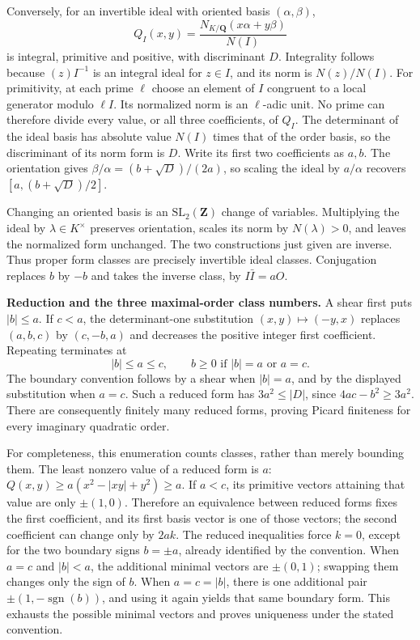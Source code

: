 \documentclass[11pt,a4paper]{article}
\begin{document}
Conversely, for an invertible ideal with oriented basis
\((\alpha,\beta)\), \[
Q_I(x,y)=\frac{N_{K/\mathbf Q}(x\alpha+y\beta)}{N(I)}
\] is integral, primitive and positive, with discriminant \(D\).
Integrality follows because \((z)I^{-1}\) is an integral ideal for
\(z\in I\), and its norm is \(N(z)/N(I)\). For primitivity, at each
prime \(\ell\) choose an element of \(I\) congruent to a local generator
modulo \(\ell I\). Its normalized norm is an \(\ell\)-adic unit. No
prime can therefore divide every value, or all three coefficients, of
\(Q_I\). The determinant of the ideal basis has absolute value \(N(I)\)
times that of the order basis, so the discriminant of its norm form is
\(D\). Write its first two coefficients as \(a,b\). The orientation
gives \(\beta/\alpha=(b+\sqrt D)/(2a)\), so scaling the ideal by
\(a/\alpha\) recovers \([a,(b+\sqrt D)/2]\).

Changing an oriented basis is an \(\mathrm{SL}_2(\mathbf Z)\) change of
variables. Multiplying the ideal by \(\lambda\in K^\times\) preserves
orientation, scales its norm by \(N(\lambda)>0\), and leaves the
normalized form unchanged. The two constructions just given are inverse.
Thus proper form classes are precisely invertible ideal classes.
Conjugation replaces \(b\) by \(-b\) and takes the inverse class, by
\(I\bar I=aO\).

\textbf{Reduction and the three maximal-order class numbers.} A shear
first puts \(|b|\leq a\). If \(c<a\), the determinant-one substitution
\((x,y)\mapsto(-y,x)\) replaces \((a,b,c)\) by \((c,-b,a)\) and
decreases the positive integer first coefficient. Repeating terminates
at \[
|b|\leq a\leq c,\qquad
b\geq0\text{ if }|b|=a\text{ or }a=c.
\] The boundary convention follows by a shear when \(|b|=a\), and by the
displayed substitution when \(a=c\). Such a reduced form has
\(3a^2\leq|D|\), since \(4ac-b^2\geq3a^2\). There are consequently
finitely many reduced forms, proving Picard finiteness for every
imaginary quadratic order.

For completeness, this enumeration counts classes, rather than merely
bounding them. The least nonzero value of a reduced form is \(a\):
\(Q(x,y)\geq a(x^2-|xy|+y^2)\geq a\). If \(a<c\), its primitive vectors
attaining that value are only \(\pm(1,0)\). Therefore an equivalence
between reduced forms fixes the first coefficient, and its first basis
vector is one of those vectors; the second coefficient can change only
by \(2ak\). The reduced inequalities force \(k=0\), except for the two
boundary signs \(b=\pm a\), already identified by the convention. When
\(a=c\) and \(|b|<a\), the additional minimal vectors are \(\pm(0,1)\);
swapping them changes only the sign of \(b\). When \(a=c=|b|\), there is
one additional pair \(\pm(1,-\operatorname{sgn}(b))\), and using it
again yields that same boundary form. This exhausts the possible minimal
vectors and proves uniqueness under the stated convention.
\end{document}
